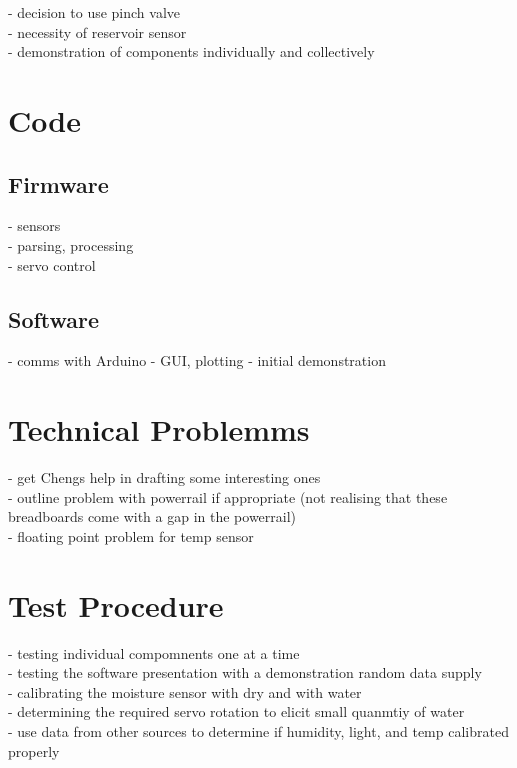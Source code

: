 \documentclass[a4paper,11pt]{article}
\begin{document}
- decision to use pinch valve\\
- necessity of reservoir sensor\\ 
- demonstration of components individually and collectively

\section{Code}
\label{sec:Code}
\subsection{Firmware}
\label{sec:Firmware}
- sensors\\
- parsing, processing\\
- servo control

\subsection{Software}
\label{sec:Software}
- comms with Arduino
- GUI, plotting
- initial demonstration

\section{Technical Problemms}
\label{sec:Technical_Problems}
- get Chengs help in drafting some interesting ones \\
- outline problem with powerrail if appropriate (not realising that these breadboards come with a gap in the powerrail)\\
- floating point problem for temp sensor

\section{Test Procedure}
\label{sec:Test_Procedure}
- testing individual compomnents one at a time \\
- testing the software presentation with a demonstration random data supply\\
- calibrating the moisture sensor with dry and with water\\
- determining the required servo rotation to elicit small quanmtiy of water\\
- use data from other sources to determine if humidity, light, and temp calibrated properly
\end{document}
